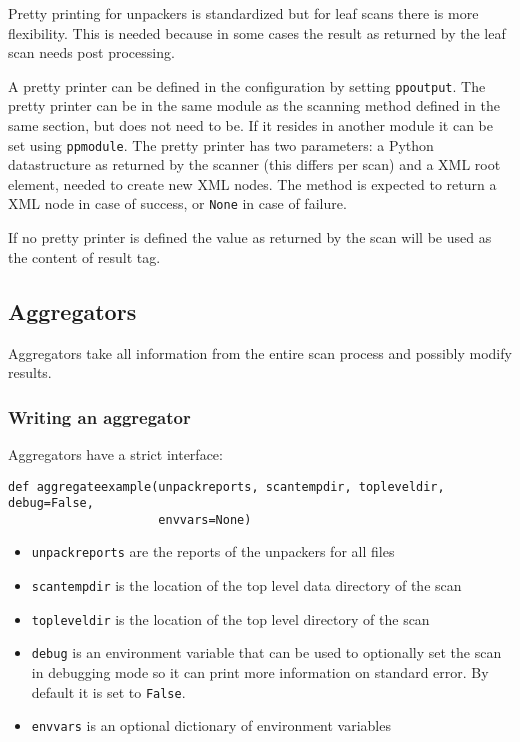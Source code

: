 \documentclass[10pt]{article}
\begin{document}
Pretty printing for unpackers is standardized but for leaf scans there is
more flexibility. This is needed because in some cases the result as returned
by the leaf scan needs post processing.

A pretty printer can be defined in the configuration by setting
\texttt{ppoutput}. The pretty printer can be in the same module as the scanning
method defined in the same section, but does not need to be. If it resides in
another module it can be set using \texttt{ppmodule}. The pretty printer has two
parameters: a Python datastructure as returned by the scanner (this differs
per scan) and a XML root element, needed to create new XML nodes. The method is
expected to return a XML node in case of success, or \texttt{None} in case of
failure.

If no pretty printer is defined the value as returned by the scan will be used
as the content of result tag.

\subsection{Aggregators}

Aggregators take all information from the entire scan process and possibly
modify results.

\subsubsection{Writing an aggregator}

Aggregators have a strict interface:

\begin{verbatim}
def aggregateexample(unpackreports, scantempdir, topleveldir, debug=False,
                     envvars=None)
\end{verbatim}

\begin{itemize}
\item \texttt{unpackreports} are the reports of the unpackers for all files
\item \texttt{scantempdir} is the location of the top level data directory of
the scan
\item \texttt{topleveldir} is the location of the top level directory of the
scan
\item \texttt{debug} is an environment variable that can be used to optionally
set the scan in debugging mode so it can print more information on standard
error. By default it is set to \texttt{False}.
\item \texttt{envvars} is an optional dictionary of environment variables
\end{itemize}
\end{document}
